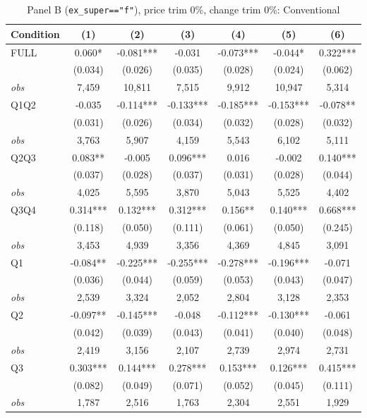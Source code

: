 \begin{table}[!htbp]
\centering
\caption{Panel B (\texttt{ex\_super=="f"}), price trim 0\%, change trim 0\%: Conventional}
\label{tab:b:trim00:conventional}
\small
\begin{tabular}{lcccccc}
\toprule
Condition & (1) & (2) & (3) & (4) & (5) & (6) \\
\midrule
FULL & 0.060* & -0.081*** & -0.031 & -0.073*** & -0.044* & 0.322*** \\
 & (0.034) & (0.026) & (0.035) & (0.028) & (0.024) & (0.062) \\
\textit{obs} &  7,459 & 10,811 &  7,515 &  9,912 & 10,947 &  5,314 \\
Q1Q2 & -0.035 & -0.114*** & -0.133*** & -0.185*** & -0.153*** & -0.078** \\
 & (0.031) & (0.026) & (0.034) & (0.032) & (0.028) & (0.032) \\
\textit{obs} & 3,763 & 5,907 & 4,159 & 5,543 & 6,102 & 5,111 \\
Q2Q3 & 0.083** & -0.005 & 0.096*** & 0.016 & -0.002 & 0.140*** \\
 & (0.037) & (0.028) & (0.037) & (0.031) & (0.028) & (0.044) \\
\textit{obs} & 4,025 & 5,595 & 3,870 & 5,043 & 5,525 & 4,402 \\
Q3Q4 & 0.314*** & 0.132*** & 0.312*** & 0.156** & 0.140*** & 0.668*** \\
 & (0.118) & (0.050) & (0.111) & (0.061) & (0.050) & (0.245) \\
\textit{obs} & 3,453 & 4,939 & 3,356 & 4,369 & 4,845 & 3,091 \\
Q1 & -0.084** & -0.225*** & -0.255*** & -0.278*** & -0.196*** & -0.071 \\
 & (0.036) & (0.044) & (0.059) & (0.053) & (0.043) & (0.047) \\
\textit{obs} & 2,539 & 3,324 & 2,052 & 2,804 & 3,128 & 2,353 \\
Q2 & -0.097** & -0.145*** & -0.048 & -0.112*** & -0.130*** & -0.061 \\
 & (0.042) & (0.039) & (0.043) & (0.041) & (0.040) & (0.048) \\
\textit{obs} & 2,419 & 3,156 & 2,107 & 2,739 & 2,974 & 2,731 \\
Q3 & 0.303*** & 0.144*** & 0.278*** & 0.153*** & 0.126*** & 0.415*** \\
 & (0.082) & (0.049) & (0.071) & (0.052) & (0.045) & (0.111) \\
\textit{obs} & 1,787 & 2,516 & 1,763 & 2,304 & 2,551 & 1,929 \\

\end{tabular}
\end{table}
